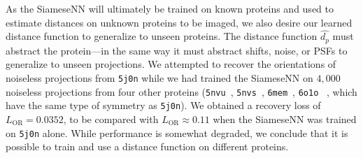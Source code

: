 As the SiameseNN will ultimately be trained on known proteins and used to estimate distances on unknown proteins to be imaged,
we also desire our learned distance function to generalize to unseen proteins.
The distance function $\widehat{d_p}$ must abstract the protein---in the same way it must abstract shifts, noise, or PSFs to generalize to unseen projections.
We attempted to recover the orientations of noiseless projections from \texttt{5j0n} while we had trained the SiameseNN on $4,000$ noiseless projections from four other proteins (\texttt{5nvu}~\cite{5nvu_pdb}, \texttt{5nvs}~\cite{5nvs_pdb}, \texttt{6mem}~\cite{6mem_pdb}, \texttt{6o1o}~\cite{6o1o_pdb} , which have the same type of symmetry as \texttt{5j0n}).
We obtained a recovery loss of $L_\text{OR} = 0.0352$,
to be compared with $L_\text{OR} \approx 0.11$ when the SiameseNN was trained on \texttt{5j0n} alone.
While performance is somewhat degraded, we conclude that it is possible to train and use a distance function on different proteins.

